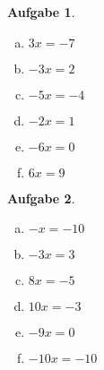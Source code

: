 \documentclass[12pt]{article}
\theoremstyle{note}
\newtheorem{aufgabe}{Aufgabe}
\begin{document}
 
    \begin{flushleft}
\begin{aufgabe} ~ \\ 
\begin{multicols}{3} 
\begin{enumerate}[a)] 
\item 
$3 x = -7$
\item 
$- 3 x = 2$
\item 
$- 5 x = -4$
\item 
$- 2 x = 1$
\item 
$- 6 x = 0$
\item 
$6 x = 9$
\end{enumerate} 
\end{multicols} 
\end{aufgabe} 
\begin{aufgabe} ~ \\ 
\begin{multicols}{3} 
\begin{enumerate}[a)] 
\item 
$- x = -10$
\item 
$- 3 x = 3$
\item 
$8 x = -5$
\item 
$10 x = -3$
\item 
$- 9 x = 0$
\item 
$- 10 x = -10$
\end{enumerate} 
\end{multicols} 
\end{aufgabe} 
\end{flushleft} 
    
\end{document}
